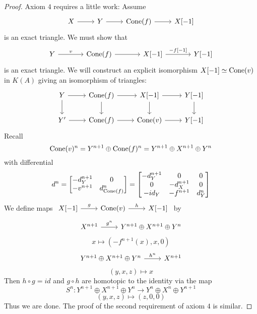 \documentclass[a4paper, UKenglish]{report}
\begin{document}
\begin{proof}
    Axiom $4$ requires a little work: Assume 
    \[
        \begin{tikzcd}
            X \arrow[r] & Y \arrow[r] & \Cone(f) \arrow[r] & X[-1]
        \end{tikzcd}
    \]
    is an exact triangle. We must show that  
    \[
        \begin{tikzcd}[column sep = large]
            Y \arrow[r, "v"] & \Cone(f) \arrow[r] & X[-1] \arrow[r, "\protect{-f[-1]}"] & Y[-1]
        \end{tikzcd}
    \]
    is an exact triangle. We will construct an explicit isomorphism $X[-1] \simeq \operatorname{Cone}(v)$ in $K(A)$ giving an isomorphism of triangles:
    \[
        \begin{tikzcd}
            Y \ar{d} \ar{r} & \Cone(f) \ar{d} \ar{r} & X[-1] \arrow{d} \ar{r} & \ar{d} Y[-1] \\
            Y' \ar{r} & \Cone(f) \ar{r} & \Cone(v) \ar{r} & Y[-1] 
        \end{tikzcd}
    \]
    Recall 
    \[
		\operatorname{Cone}(v)^n = Y^{n+1} \oplus \operatorname{Cone}(f)^n = Y^{n+1} \oplus X^{n+1} \oplus Y^n
	\] 
	with differential 
    \[
        d^n 
        = 
        \begin{bmatrix} 
            -d_Y^{n+1} & 0 \\ 
            -v^{n+1}   & d_{\operatorname{Cone}(f)}^n 
        \end{bmatrix}
        =
        \begin{bmatrix} 
            -d_Y^{n+1} &  0         & 0 \\ 
            0          & -d_X^{n+1} & 0 \\ 
            -id_Y      & -f^{n+1}   & d_Y^n 
        \end{bmatrix} 
    \]
    We define maps $\begin{tikzcd} X[-1] \ar[r, "g"] & \Cone(v) \ar[r, "h"] & X[-1] \end{tikzcd}$ by
    \[ 
    	\begin{tikzcd}
            X^{n+1} \ar[r, "g^n"] & Y^{n+1} \oplus X^{n+1} \oplus Y^n 
        \end{tikzcd}
    \]
    \[ 
        x \mapsto (-f^{n+1}(x),x,0) 
    \]
    \[ 
        \begin{tikzcd}
            Y^{n+1} \oplus X^{n+1} \oplus Y^n \ar[r, "h^n"] & X^{n+1}
        \end{tikzcd}  
    \]
    \[ 
        (y,x,z) \mapsto x 
    \]
    Then $h \circ g = id$ and $g \circ h$ are homotopic to the identity via the map
    \[
        S^n \colon Y^{n+1} \oplus X^{n+1} \oplus Y^n \to Y^n \oplus X^n \oplus Y^{n+1} 
    \]
    \[ 
        (y,x,z) \mapsto (z,0,0) 
    \]
    Thus we are done. The proof of the second requirement of axiom $4$ is similar.
\end{proof}
\end{document}
